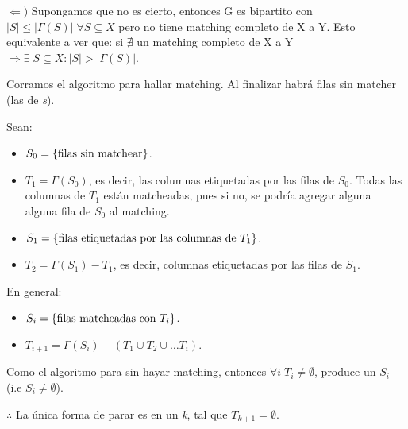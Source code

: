 \documentclass[12pt,a4paper]{report}
\newcounter{neq}
\begin{document}
			\vspace{5mm}
			\par $\Leftarrow)$ Supongamos que no es cierto, entonces G es bipartito con $\lvert S \rvert \leq \lvert \Gamma(S) \rvert \; \forall S \subseteq X$ pero no tiene matching completo de X a Y. Esto equivalente a ver que: si $\nexists$ un matching completo de X a Y $\Rightarrow \exists \; S \subseteq X : \lvert S \rvert > \lvert \Gamma(S) \rvert$.

			\vspace{5 mm}
			\par Corramos el algoritmo para hallar matching. Al finalizar habrá filas sin matcher (las de \textit{s}).

			\vspace{5mm}
			\par Sean:
			\begin{itemize}
				\item $S_{0} = \lbrace \textup{filas sin matchear} \rbrace$.
				\item $T_{1} = \Gamma(S_{0})$, es decir, las columnas etiquetadas por las filas de $S_{0}$. Todas las columnas de $T_{1}$ están matcheadas, pues si no, se podría agregar alguna alguna fila de $S_{0}$ al matching.
				\item $S_{1} = \lbrace \textup{filas etiquetadas por las columnas de } T_{1}\rbrace$.
				\item $T_{2} = \Gamma(S_{1}) - T_{1}$, es decir, columnas etiquetadas por las filas de $S_{1}$.
			\end{itemize}

			\par En general:
			\begin{center}
				\begin{itemize}
					\item $S_{i} = \lbrace \textup{filas matcheadas con } T_{i}\rbrace$.
					\item $T_{i+1} = \Gamma(S_{i}) - (T_{1} \cup T_{2} \cup \dotsc T_{i})$.
				\end{itemize}
			\end{center}

			\par Como el algoritmo para sin hayar matching, entonces $\forall i \; T_{i} \neq \emptyset $, produce un $S_{i}$  (i.e $S_{i} \neq \emptyset$).
			\par $\therefore$ La única forma de parar es en un \textit{k}, tal que $T_{k+1} = \emptyset$.
\end{document}
